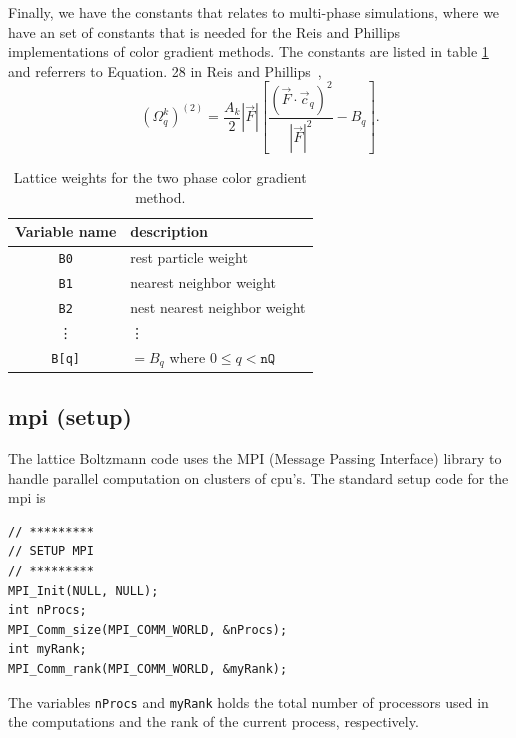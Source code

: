 \documentclass[11pt,a4paper]{report}
\begin{document}
Finally, we have the constants that relates to multi-phase simulations, where we have an set of constants that is needed for the Reis and Phillips~\cite{reis_lattice_2007} implementations of color gradient methods. The constants are listed in table \ref{tab:lattice weights two phase} and referrers to Equation. 28 in Reis and Phillips~\cite{reis_lattice_2007},
\begin{equation*}
\left(\Omega_q^k\right)^{(2)} = \frac{A_k}{2}|\vec{F}|\left[\frac{\left(\vec{F}\cdot\vec{c}_q\right)^2}{|\vec{F}|^2}- B_q\right].
\end{equation*}
\begin{table}
	\centering
	\begin{tabular}{|c|l|}\hline
		Variable name & description \\ \hline
		\texttt{B0} & rest particle weight \\ 
		\texttt{B1} & nearest neighbor weight \\ 
		\texttt{B2} & nest nearest neighbor weight \\ 
		\vdots & \vdots \\ \hline
		\texttt{B[q]} & $=B_q$ where $0\leq q < \texttt{nQ}$ \\ \hline
	\end{tabular}
	\caption{Lattice weights for the two phase color gradient method.}
	\label{tab:lattice weights two phase}
\end{table}

\subsection{mpi (setup)}
The lattice Boltzmann code uses the MPI (Message Passing Interface) library to handle parallel computation on clusters of cpu's. The standard setup code for the mpi is
\begin{verbatim}
// *********
// SETUP MPI
// *********
MPI_Init(NULL, NULL);
int nProcs;
MPI_Comm_size(MPI_COMM_WORLD, &nProcs);
int myRank;
MPI_Comm_rank(MPI_COMM_WORLD, &myRank);
\end{verbatim} 
The variables \texttt{nProcs} and \texttt{myRank} holds the total number of processors used in the computations and the rank of the current process, respectively.
\end{document}
